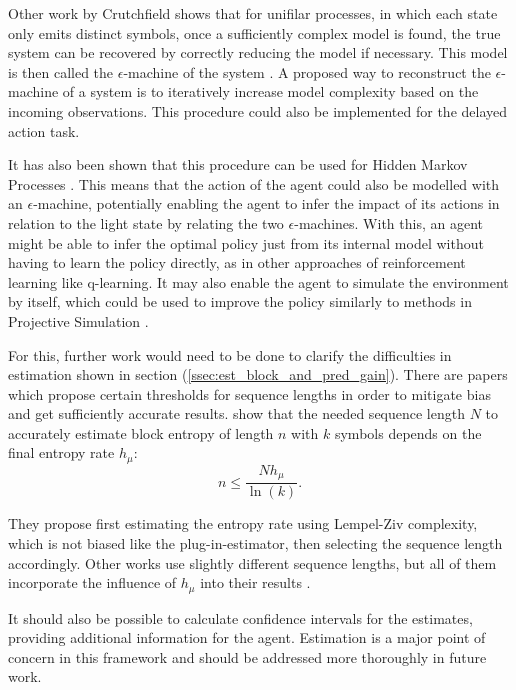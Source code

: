 \documentclass[12pt,a4paper]{article}
\begin{document}
Other work by Crutchfield shows that for unifilar processes, in which each state only emits distinct symbols, once a sufficiently complex model is found, the true system can be recovered by correctly reducing the model if necessary.
This model is then called the $\epsilon$-machine of the system \autocite{crutchfield1994calculi}.
A proposed way to reconstruct the $\epsilon$-machine of a system is to iteratively increase model complexity based on the incoming observations.
This procedure could also be implemented for the delayed action task.

It has also been shown that this procedure can be used for Hidden Markov Processes \autocite{jurgens2021HMP}.
This means that the action of the agent could also be modelled with an $\epsilon$-machine, potentially enabling the agent to infer the impact of its actions in relation to the light state by relating the two $\epsilon$-machines.
With this, an agent might be able to infer the optimal policy just from its internal model without having to learn the policy directly, as in other approaches of reinforcement learning like q-learning.
It may also enable the agent to simulate the environment by itself, which could be used to improve the policy similarly to methods in Projective Simulation \autocite{briegel2012ps}.

For this, further work would need to be done to clarify the difficulties in estimation shown in section (\ref{ssec:est_block_and_pred_gain}).
There are papers which propose certain thresholds for sequence lengths in order to mitigate bias and get sufficiently accurate results.
\autocite{lesne2009entropy} show that the needed sequence length $N$ to accurately estimate block entropy of length $n$ with $k$ symbols depends on the final entropy rate $h_\mu$:
\begin{equation}
    \label{eq:lesne_seq_length}
    n \leq \frac{N h_\mu}{\ln(k)}.
\end{equation}

They propose first estimating the entropy rate using Lempel-Ziv complexity, which is not biased like the plug-in-estimator, then selecting the sequence length accordingly.
Other works use slightly different sequence lengths, but all of them incorporate the influence of $h_\mu$ into their results \autocite{larson2011block,dkebowski2016consistency}.

It should also be possible to calculate confidence intervals for the estimates, providing additional information for the agent. Estimation is a major point of concern in this framework and should be addressed more thoroughly in future work.
\end{document}
